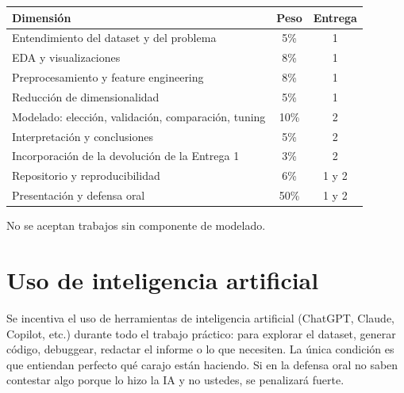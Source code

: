 \documentclass[12pt]{article}
\begin{document}
\begin{center}
\begin{tabular}{l c c}
\toprule
\textbf{Dimensión} & \textbf{Peso} & \textbf{Entrega} \\
\midrule
Entendimiento del dataset y del problema & 5\% & 1 \\
EDA y visualizaciones & 8\% & 1 \\
Preprocesamiento y feature engineering & 8\% & 1 \\
Reducción de dimensionalidad & 5\% & 1 \\
Modelado: elección, validación, comparación, tuning & 10\% & 2 \\
Interpretación y conclusiones & 5\% & 2 \\
Incorporación de la devolución de la Entrega 1 & 3\% & 2 \\
Repositorio y reproducibilidad & 6\% & 1 y 2 \\
Presentación y defensa oral & 50\% & 1 y 2 \\
\bottomrule
\end{tabular}
\end{center}

No se aceptan trabajos sin componente de modelado.

\section{Uso de inteligencia artificial}

Se incentiva el uso de herramientas de inteligencia artificial (ChatGPT, Claude, Copilot, etc.) durante todo el trabajo práctico: para explorar el dataset, generar código, debuggear, redactar el informe o lo que necesiten. La única condición es que entiendan perfecto qué carajo están haciendo. Si en la defensa oral no saben contestar algo porque lo hizo la IA y no ustedes, se penalizará fuerte.
\end{document}
